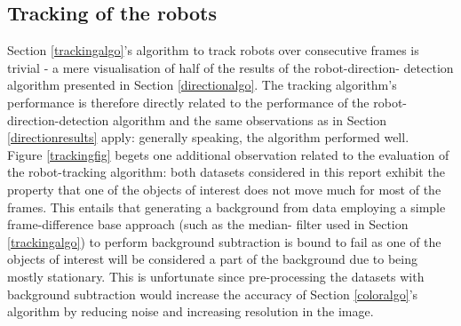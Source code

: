 \documentclass[10pt,a4paper]{article}
\begin{document}
\subsection{Tracking of the robots}\label{trackingresults}
Section \ref{trackingalgo}'s algorithm to track robots over consecutive frames
is trivial - a mere visualisation of half of the results of the robot-direction-
detection algorithm presented in Section \ref{directionalgo}. The tracking 
algorithm's performance is therefore directly related to the performance of 
the robot-direction-detection algorithm and the same observations as in Section
\ref{directionresults} apply: generally speaking, the algorithm performed 
well.\\
Figure \ref{trackingfig} begets one additional observation related to the
evaluation of the robot-tracking algorithm: both datasets considered in this
report exhibit the property that one of the objects of interest does not move
much for most of the frames. This entails that generating a background from
data employing a simple frame-difference base approach (such as the median-
filter used in Section \ref{trackingalgo}) to perform background subtraction 
is bound to  fail as one of the objects of interest will be considered a part 
of the background due to being mostly stationary. This is unfortunate since
pre-processing the datasets with background subtraction would increase the
accuracy of Section \ref{coloralgo}'s algorithm by reducing noise and increasing
resolution in the image.
\end{document}
